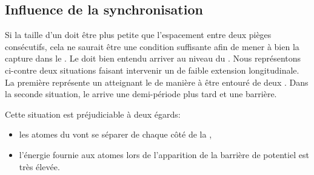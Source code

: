 
 

\subsection{Influence de la synchronisation}\label{sec:ConvInfluenceSynchro}
\RemonteUnPeuFig
Si la taille d'un \pat doit être plus petite que l'espacement entre deux pièges consécutifs, cela ne saurait être une condition suffisante afin de mener à bien la capture dans le \tp. Le \p doit bien entendu arriver au niveau du \conv {}. Nous représentons ci-contre deux situations faisant intervenir un \pat de faible extension longitudinale. La première représente un \p atteignant le \tp de manière à être entouré de deux \bapots. Dans la seconde situation, le \p arrive une demi-période plus tard et  une barrière.

\noindent Cette situation est préjudiciable à deux égards:
\begin{itemize}
	\item les atomes du \p vont se séparer de chaque côté de la \bapot,
	\item l'énergie fournie aux atomes lors de l'apparition de la barrière de  potentiel est très élevée.
\end{itemize}

\casse

